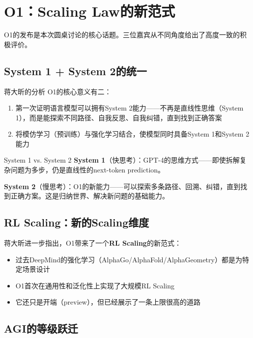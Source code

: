 \section{O1：Scaling Law的新范式}

O1的发布是本次圆桌讨论的核心话题。三位嘉宾从不同角度给出了高度一致的积极评价。

\subsection{System 1 + System 2的统一}

\begin{importantbox}{蒋大昕的分析}
O1的核心意义有二：
\begin{enumerate}
\item 第一次证明语言模型可以拥有System 2能力——不再是直线性思维（System 1），而是能探索不同路径、自我反思、自我纠错，直到找到正确答案
\item 将模仿学习（预训练）与强化学习结合，使模型同时具备System 1和System 2能力
\end{enumerate}
\end{importantbox}

\begin{knowledgebox}{System 1 vs. System 2}
\textbf{System 1}（快思考）：GPT-4的思维方式——即使拆解复杂问题为多步，仍是直线性的next-token prediction。

\textbf{System 2}（慢思考）：O1的新能力——可以探索多条路径、回溯、纠错，直到找到正确方案。这是归纳世界、解决新问题的基础能力。
\end{knowledgebox}

\subsection{RL Scaling：新的Scaling维度}

蒋大昕进一步指出，O1带来了一个\textbf{RL Scaling}的新范式：

\begin{itemize}
\item 过去DeepMind的强化学习（AlphaGo/AlphaFold/AlphaGeometry）都是为特定场景设计
\item O1首次在通用性和泛化性上实现了大规模RL Scaling
\item 它还只是开端（preview），但已经展示了一条上限很高的道路
\end{itemize}

\subsection{AGI的等级跃迁}

